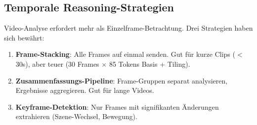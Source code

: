 \subsection{Temporale Reasoning-Strategien}

Video-Analyse erfordert mehr als Einzelframe-Betrachtung. Drei Strategien haben sich bewährt:

\begin{enumerate}[leftmargin=*]
    \item \textbf{Frame-Stacking}: Alle Frames auf einmal senden. Gut für kurze Clips ($<$ 30s), aber teuer (30 Frames $\times$ 85 Tokens Basis + Tiling).
    \item \textbf{Zusammenfassungs-Pipeline}: Frame-Gruppen separat analysieren, Ergebnisse aggregieren. Gut für lange Videos.
    \item \textbf{Keyframe-Detektion}: Nur Frames mit signifikanten Änderungen extrahieren (Szene-Wechsel, Bewegung).
\end{enumerate}

